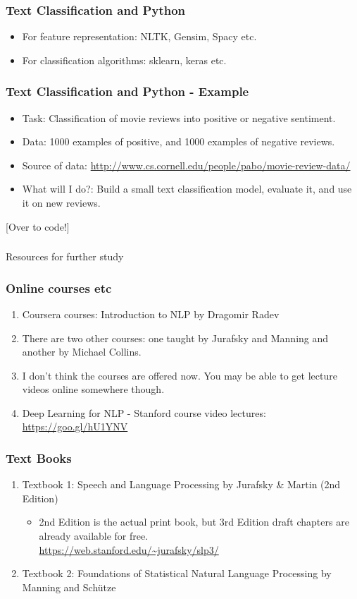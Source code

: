 \documentclass{beamer}
\begin{document}
\begin{frame}
\frametitle{Text Classification and Python}
\begin{itemize}
\item For feature representation: NLTK, Gensim, Spacy etc.
\item For classification algorithms: sklearn, keras etc. 
\end{itemize}
\end{frame}

\begin{frame}
\frametitle{Text Classification and Python - Example}
\begin{itemize}
\item Task: Classification of movie reviews into positive or negative sentiment.
\item Data: 1000 examples of positive, and 1000 examples of negative reviews.
\item Source of data: \url{http://www.cs.cornell.edu/people/pabo/movie-review-data/}
\item What will I do?: Build a small text classification model, evaluate it, and use it on new reviews.
\end{itemize}

[Over to code!]
\end{frame}

\begin{frame}
\frametitle{}
\Large Resources for further study
\end{frame}

\begin{frame}
\frametitle{Online courses etc}
\begin{enumerate}
\item Coursera courses: Introduction to NLP by Dragomir Radev
\item There are two other courses: one taught by Jurafsky and Manning and another by Michael Collins. 
\item I don't think the courses are offered now. You may be able to get lecture videos online somewhere though.
\item Deep Learning for NLP - Stanford course video lectures: \url{https://goo.gl/hU1YNV}
\end{enumerate}
\end{frame}

\begin{frame}
\frametitle{Text Books}
\begin{enumerate}
\item Textbook 1: Speech and Language Processing by Jurafsky \& Martin (2nd Edition)
\begin{itemize}
\item 2nd Edition is the actual print book, but 3rd Edition draft chapters are already available for free. 
\\ \url{https://web.stanford.edu/~jurafsky/slp3/}
\end{itemize}
\item Textbook 2: Foundations of Statistical Natural Language Processing by Manning and Sch\"utze
\end{enumerate}
\end{frame}
\end{document}

